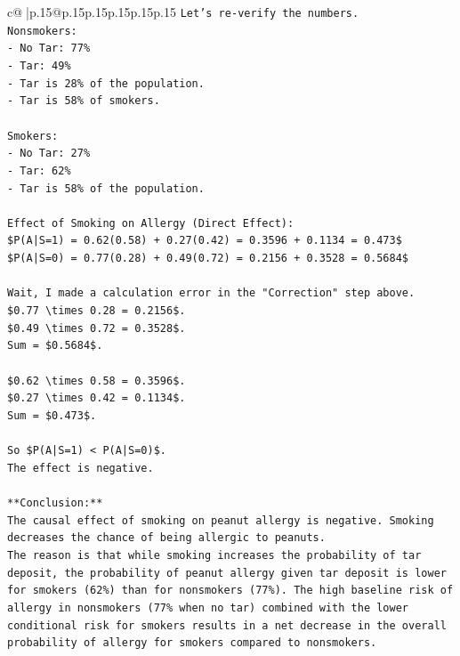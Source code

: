 \documentclass{article}
\begin{document}
{\begin{supertabular}{c@{$\;$}|p{.15\linewidth}@{}p{.15\linewidth}p{.15\linewidth}p{.15\linewidth}p{.15\linewidth}p{.15\linewidth}}
{{{\texttt{Let's re{-}verify the numbers.} \\
\texttt{Nonsmokers:} \\
\texttt{{-} No Tar: 77\%} \\
\texttt{{-} Tar: 49\%} \\
\texttt{{-} Tar is 28\% of the population.} \\
\texttt{{-} Tar is 58\% of smokers.} \\
\\ 
\texttt{Smokers:} \\
\texttt{{-} No Tar: 27\%} \\
\texttt{{-} Tar: 62\%} \\
\texttt{{-} Tar is 58\% of the population.} \\
\\ 
\texttt{Effect of Smoking on Allergy (Direct Effect):} \\
\texttt{\$P(A|S=1) = 0.62(0.58) + 0.27(0.42) = 0.3596 + 0.1134 = 0.473\$} \\
\texttt{\$P(A|S=0) = 0.77(0.28) + 0.49(0.72) = 0.2156 + 0.3528 = 0.5684\$} \\
\\ 
\texttt{Wait, I made a calculation error in the "Correction" step above.} \\
\texttt{\$0.77 \textbackslash{}times 0.28 = 0.2156\$.} \\
\texttt{\$0.49 \textbackslash{}times 0.72 = 0.3528\$.} \\
\texttt{Sum = \$0.5684\$.} \\
\\ 
\texttt{\$0.62 \textbackslash{}times 0.58 = 0.3596\$.} \\
\texttt{\$0.27 \textbackslash{}times 0.42 = 0.1134\$.} \\
\texttt{Sum = \$0.473\$.} \\
\\ 
\texttt{So \$P(A|S=1) < P(A|S=0)\$.} \\
\texttt{The effect is negative.} \\
\\ 
\texttt{**Conclusion:**} \\
\texttt{The causal effect of smoking on peanut allergy is negative. Smoking decreases the chance of being allergic to peanuts.} \\
\texttt{The reason is that while smoking increases the probability of tar deposit, the probability of peanut allergy given tar deposit is lower for smokers (62\%) than for nonsmokers (77\%). The high baseline risk of allergy in nonsmokers (77\% when no tar) combined with the lower conditional risk for smokers results in a net decrease in the overall probability of allergy for smokers compared to nonsmokers.} \\
}}}
\end{supertabular}}
\end{document}
